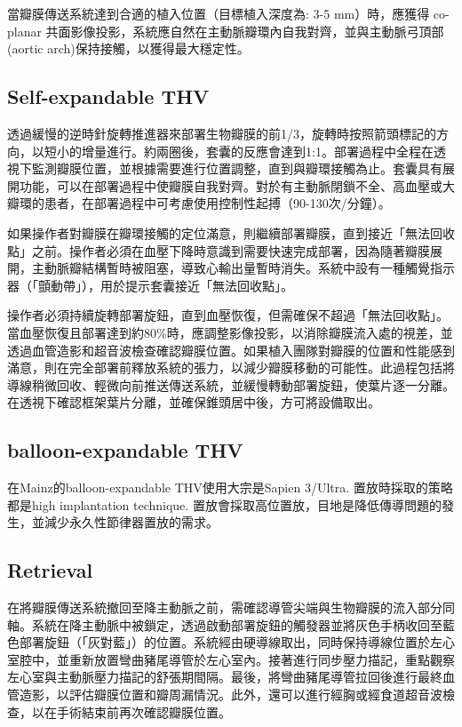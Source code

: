 \documentclass[nols]{tufte-book}
\begin{document}
當瓣膜傳送系統達到合適的植入位置（目標植入深度為: 3-5 mm）時，應獲得 co-planar 共面影像投影，系統應自然在主動脈瓣環內自我對齊，並與主動脈弓頂部 (aortic arch)保持接觸，以獲得最大穩定性。

\subsection{Self-expandable THV}
透過緩慢的逆時針旋轉推進器來部署生物瓣膜的前1/3，旋轉時按照箭頭標記的方向，以短小的增量進行。約兩圈後，套囊的反應會達到1:1。部署過程中全程在透視下監測瓣膜位置，並根據需要進行位置調整，直到與瓣環接觸為止。套囊具有展開功能，可以在部署過程中使瓣膜自我對齊。對於有主動脈閉鎖不全、高血壓或大瓣環的患者，在部署過程中可考慮使用控制性起搏（90-130次/分鐘）。

如果操作者對瓣膜在瓣環接觸的定位滿意，則繼續部署瓣膜，直到接近「無法回收點」之前。操作者必須在血壓下降時意識到需要快速完成部署，因為隨著瓣膜展開，主動脈瓣結構暫時被阻塞，導致心輸出量暫時消失。系統中設有一種觸覺指示器（「顫動帶」），用於提示套囊接近「無法回收點」。

操作者必須持續旋轉部署旋鈕，直到血壓恢復，但需確保不超過「無法回收點」。當血壓恢復且部署達到約80\%時，應調整影像投影，以消除瓣膜流入處的視差，並透過血管造影和超音波檢查確認瓣膜位置。如果植入團隊對瓣膜的位置和性能感到滿意，則在完全部署前釋放系統的張力，以減少瓣膜移動的可能性。此過程包括將導線稍微回收、輕微向前推送傳送系統，並緩慢轉動部署旋鈕，使葉片逐一分離。在透視下確認框架葉片分離，並確保錐頭居中後，方可將設備取出。

\subsection{balloon-expandable THV}
在Mainz的balloon-expandable THV使用大宗是Sapien 3/Ultra. 置放時採取的策略都是high implantation technique.\cite{Ochiai2023} 置放會採取高位置放，目地是降低傳導問題的發生，並減少永久性節律器置放的需求。

\subsection{Retrieval}

在將瓣膜傳送系統撤回至降主動脈之前，需確認導管尖端與生物瓣膜的流入部分同軸。系統在降主動脈中被鎖定，透過啟動部署旋鈕的觸發器並將灰色手柄收回至藍色部署旋鈕（「灰對藍」）的位置。系統經由硬導線取出，同時保持導線位置於左心室腔中，並重新放置彎曲豬尾導管於左心室內。接著進行同步壓力描記，重點觀察左心室與主動脈壓力描記的舒張期間隔。最後，將彎曲豬尾導管拉回後進行最終血管造影，以評估瓣膜位置和瓣周漏情況。此外，還可以進行經胸或經食道超音波檢查，以在手術結束前再次確認瓣膜位置。
\end{document}
